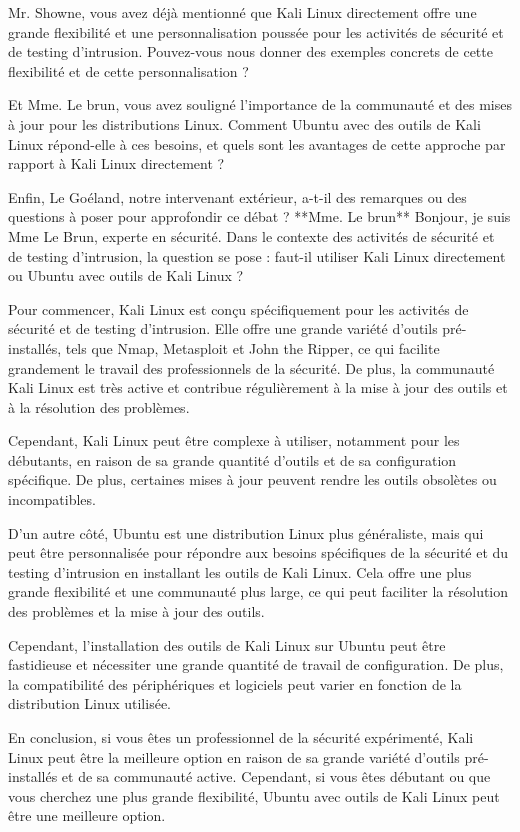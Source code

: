 Mr. Showne, vous avez déjà mentionné que Kali Linux directement offre une grande flexibilité et une personnalisation poussée pour les activités de sécurité et de testing d'intrusion. Pouvez-vous nous donner des exemples concrets de cette flexibilité et de cette personnalisation ?

Et Mme. Le brun, vous avez souligné l'importance de la communauté et des mises à jour pour les distributions Linux. Comment Ubuntu avec des outils de Kali Linux répond-elle à ces besoins, et quels sont les avantages de cette approche par rapport à Kali Linux directement ?

Enfin, Le Goéland, notre intervenant extérieur, a-t-il des remarques ou des questions à poser pour approfondir ce débat ?
**Mme. Le brun**
Bonjour, je suis Mme Le Brun, experte en sécurité. Dans le contexte des activités de sécurité et de testing d'intrusion, la question se pose : faut-il utiliser Kali Linux directement ou Ubuntu avec outils de Kali Linux ? 

Pour commencer, Kali Linux est conçu spécifiquement pour les activités de sécurité et de testing d'intrusion. Elle offre une grande variété d'outils pré-installés, tels que Nmap, Metasploit et John the Ripper, ce qui facilite grandement le travail des professionnels de la sécurité. De plus, la communauté Kali Linux est très active et contribue régulièrement à la mise à jour des outils et à la résolution des problèmes.

Cependant, Kali Linux peut être complexe à utiliser, notamment pour les débutants, en raison de sa grande quantité d'outils et de sa configuration spécifique. De plus, certaines mises à jour peuvent rendre les outils obsolètes ou incompatibles.

D'un autre côté, Ubuntu est une distribution Linux plus généraliste, mais qui peut être personnalisée pour répondre aux besoins spécifiques de la sécurité et du testing d'intrusion en installant les outils de Kali Linux. Cela offre une plus grande flexibilité et une communauté plus large, ce qui peut faciliter la résolution des problèmes et la mise à jour des outils.

Cependant, l'installation des outils de Kali Linux sur Ubuntu peut être fastidieuse et nécessiter une grande quantité de travail de configuration. De plus, la compatibilité des périphériques et logiciels peut varier en fonction de la distribution Linux utilisée.

En conclusion, si vous êtes un professionnel de la sécurité expérimenté, Kali Linux peut être la meilleure option en raison de sa grande variété d'outils pré-installés et de sa communauté active. Cependant, si vous êtes débutant ou que vous cherchez une plus grande flexibilité, Ubuntu avec outils de Kali Linux peut être une meilleure option.

